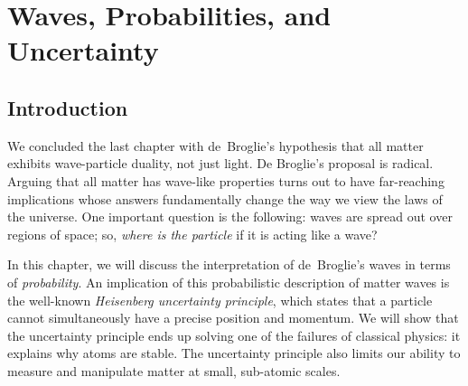\chapter[Waves, Probabilities, and Uncertainty]{Waves, Probabilities, and 
  Uncertainty}

\label{chapter:uncertainty}

\section{Introduction}

We concluded the last chapter with de~Broglie's hypothesis that all
matter exhibits wave-particle duality, not just light.  
De Broglie's proposal is radical.  Arguing that all matter has wave-like
properties turns out to have far-reaching implications whose answers
fundamentally change the way we view the laws of the universe.
One important question is the following: waves are spread out over regions
of space; so, {\it where is the particle} if it is acting like a wave?

In this chapter, we will discuss the interpretation of de~Broglie's waves
in terms of {\it probability}. An implication of this probabilistic
description of matter waves is the well-known \textit{Heisenberg
uncertainty principle}, which states that a particle cannot simultaneously
have a precise position and momentum.  We will show that the uncertainty
principle ends up solving one of the failures of classical physics:
it explains why atoms are stable. The uncertainty principle also limits
our ability to measure and manipulate matter at small, sub-atomic scales.

